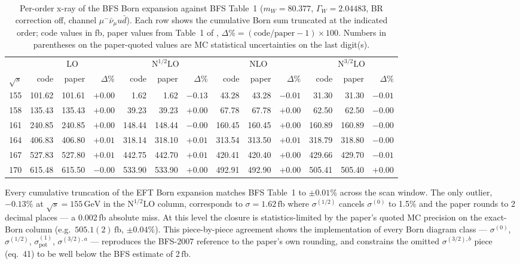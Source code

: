 \documentclass[11pt,a4paper]{article}
\newcommand{\mW}{m_W}
\newcommand{\GammaW}{\Gamma_W}
\newcommand{\sqrts}{\sqrt{s}}
\newcommand{\munuqq}{\mu^-\bar\nu_\mu u\bar d}
\newcommand{\fb}{\ensuremath{\,\mathrm{fb}}}
\newcommand{\GeV}{\ensuremath{\,\mathrm{GeV}}}
\begin{document}
\begin{table}[h]
\centering
\caption{Per-order x-ray of the BFS Born expansion against BFS Table~1
($\mW=80.377$, $\GammaW=2.04483$, BR correction off, channel $\munuqq$).
Each row shows the cumulative Born sum truncated at the indicated order;
code values in fb, paper values from Table~1 of \cite{BFSnlo}, $\Delta\%
= (\text{code}/\text{paper}-1)\times 100$. Numbers in parentheses on the
paper-quoted values are MC statistical uncertainties on the last digit(s).}
\small
\setlength{\tabcolsep}{4pt}
\begin{tabular}{r | r r r | r r r | r r r | r r r}
\toprule
 & \multicolumn{3}{c|}{LO}
 & \multicolumn{3}{c|}{$\mathrm{N}^{1/2}\mathrm{LO}$}
 & \multicolumn{3}{c|}{NLO}
 & \multicolumn{3}{c}{$\mathrm{N}^{3/2}\mathrm{LO}$} \\
$\sqrts$ & code & paper & $\Delta\%$
         & code & paper & $\Delta\%$
         & code & paper & $\Delta\%$
         & code & paper & $\Delta\%$ \\
\midrule
155 & 101.62 & 101.61 & $+0.00$ &   1.62 &   1.62 & $-0.13$ &  43.28 &  43.28 & $-0.01$ &  31.30 &  31.30 & $-0.01$ \\
158 & 135.43 & 135.43 & $+0.00$ &  39.23 &  39.23 & $+0.00$ &  67.78 &  67.78 & $+0.00$ &  62.50 &  62.50 & $-0.00$ \\
161 & 240.85 & 240.85 & $+0.00$ & 148.44 & 148.44 & $-0.00$ & 160.45 & 160.45 & $+0.00$ & 160.89 & 160.89 & $-0.00$ \\
164 & 406.83 & 406.80 & $+0.01$ & 318.14 & 318.10 & $+0.01$ & 313.54 & 313.50 & $+0.01$ & 318.79 & 318.80 & $-0.00$ \\
167 & 527.83 & 527.80 & $+0.01$ & 442.75 & 442.70 & $+0.01$ & 420.41 & 420.40 & $+0.00$ & 429.66 & 429.70 & $-0.01$ \\
170 & 615.48 & 615.50 & $-0.00$ & 533.90 & 533.90 & $+0.00$ & 492.91 & 492.90 & $+0.00$ & 505.41 & 505.40 & $+0.00$ \\
\bottomrule
\end{tabular}
\label{tab:val-born-T1-orders}
\end{table}

Every cumulative truncation of the EFT Born expansion matches BFS Table~1
to $\pm 0.01\%$ across the scan window. The only outlier, $-0.13\%$ at
$\sqrts=155\GeV$ in the $\mathrm{N}^{1/2}\mathrm{LO}$ column, corresponds
to $\sigma=1.62\fb$ where $\sigma^{(1/2)}$ cancels $\sigma^{(0)}$ to 1.5\%
and the paper rounds to 2 decimal places — a 0.002\,fb absolute miss. At
this level the closure is statistics-limited by the paper's quoted MC
precision on the exact-Born column (e.g.\ $505.1(2)\fb$, $\pm 0.04\%$).
This piece-by-piece agreement shows the implementation of every Born
diagram class — $\sigma^{(0)}$, $\sigma^{(1/2)}$, $\sigma^{(1)}_{\text{pot}}$,
$\sigma^{(3/2),a}$ — reproduces the BFS-2007 reference to the paper's
own rounding, and
constrains the omitted $\sigma^{(3/2),b}$ piece (eq.~41) to be well
below the BFS estimate of 2\fb.
\end{document}
